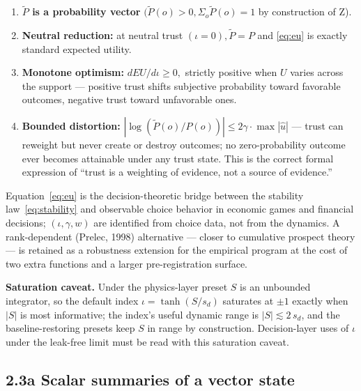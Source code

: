 \documentclass[11pt,twocolumn]{article}
\theoremstyle{gttdef}
\theoremstyle{gttplain}
\begin{document}
\begin{enumerate}

\item \textbf{$\tilde{P}$ is a probability vector} $(\tilde{P}(o) > 0, \Sigma_o \tilde{P}(o) = 1$ by construction of Z).

\item \textbf{Neutral reduction:} at neutral trust $(\iota = 0), \tilde{P} = P$ and \eqref{eq:eu} is exactly standard expected utility.

\item \textbf{Monotone optimism:} $dEU/d\iota \geq 0,$ strictly positive when $U$ varies across the support --- positive trust shifts subjective probability toward favorable outcomes, negative trust toward unfavorable ones.

\item \textbf{Bounded distortion:} $|\log(\tilde{P}(o)/P(o))| \leq 2\gamma\cdot \max|\hat{u}|$ --- trust can reweight but never create or destroy outcomes; no zero-probability outcome ever becomes attainable under any trust state. This is the correct formal expression of ``trust is a weighting of evidence, not a source of evidence.''

\end{enumerate}

Equation~\eqref{eq:eu} is the decision-theoretic bridge between the stability law~\eqref{eq:stability} and observable choice behavior in economic games and financial decisions; $(\iota, \gamma, w)$ are identified from choice data, not from the dynamics. A rank-dependent (Prelec, 1998) alternative --- closer to cumulative prospect theory --- is retained as a robustness extension for the empirical program at the cost of two extra functions and a larger pre-registration surface.

\textbf{Saturation caveat.} Under the physics-layer preset $S$ is an unbounded integrator, so the default index $\iota = \tanh(S/s_d)$ saturates at $\pm 1$ exactly when $|S|$ is most informative; the index's useful dynamic range is $|S| \lesssim 2\,s_d$, and the baseline-restoring presets keep $S$ in range by construction. Decision-layer uses of $\iota$ under the leak-free limit must be read with this saturation caveat.

\subsection*{2.3a Scalar summaries of a vector state}
\end{document}
